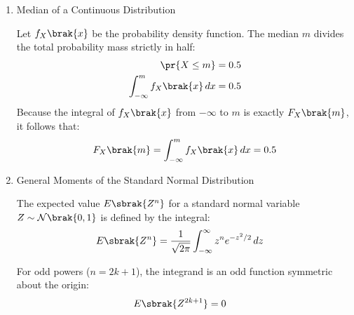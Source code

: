 \begin{enumerate}[label=\thesubsection.\arabic*, ref=\thesubsection.\theenumi]
\begin{itemize}
		\item $h\brak{k}$: The primary hash function that calculates the initial target index.
		\item $i$: The probe attempt number, starting at $0$ and incrementing linearly for each collision encountered.
		\item $M$: The total allocated size of the hash table.
		\item $\pmod M$: The modulo operation ensuring the probe sequence wraps around to index $0$ if the end of the table is reached.
		\item $h\brak{k, i}$: The final calculated storage index for the $i$-th probe attempt.
	\end{itemize}
	\item Median of a Continuous Distribution
	
	Let $f_X\brak{x}$ be the probability density function. The median $m$ divides the total probability mass strictly in half:
	\begin{align}
		\pr{X \le m} &= 0.5
		\\
		\int_{-\infty}^{m} f_X\brak{x} \, dx &= 0.5
	\end{align}
	Because the integral of $f_X\brak{x}$ from $-\infty$ to $m$ is exactly $F_X\brak{m}$, it follows that:
	\begin{align}
		F_X\brak{m} = \int_{-\infty}^{m} f_X\brak{x} \, dx = 0.5 \label{eq:DA2025-median}
	\end{align}
	
	\item General Moments of the Standard Normal Distribution
	
	The expected value $E\sbrak{Z^n}$ for a standard normal variable $Z \sim \mathcal{N}\brak{0, 1}$ is defined by the integral:
	\begin{align}
		E\sbrak{Z^n} &= \frac{1}{\sqrt{2\pi}} \int_{-\infty}^{\infty} z^n e^{-z^2/2} \,dz \label{eq:DA2025-normal_moment_integral}
	\end{align}
	
	For odd powers ($n = 2k + 1$), the integrand is an odd function symmetric about the origin:
	\begin{align}
		E\sbrak{Z^{2k+1}} &= 0 \label{eq:DA2025-normal_moment_odd}
	\end{align}
	

\end{enumerate}
